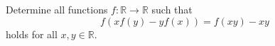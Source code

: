 Determine all functions $f\colon\mathbb{R} \to \mathbb{R}$ such that
$$f(xf(y) - y f(x)) = f(xy) - xy$$
holds for all $x, y \in \mathbb{R}$.
